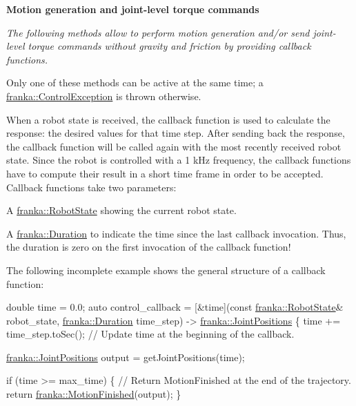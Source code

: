\begin{Indent}\textbf{ Motion generation and joint-\/level torque commands}\par
{\em The following methods allow to perform motion generation and/or send joint-\/level torque commands without gravity and friction by providing callback functions.

Only one of these methods can be active at the same time; a \hyperlink{structfranka_1_1ControlException}{franka\+::\+Control\+Exception} is thrown otherwise.

\label{classfranka_1_1Robot_callback-docs}%
%
When a robot state is received, the callback function is used to calculate the response\+: the desired values for that time step. After sending back the response, the callback function will be called again with the most recently received robot state. Since the robot is controlled with a 1 k\+Hz frequency, the callback functions have to compute their result in a short time frame in order to be accepted. Callback functions take two parameters\+:


\begin{DoxyItemize}
\item A \hyperlink{structfranka_1_1RobotState}{franka\+::\+Robot\+State} showing the current robot state.
\item A \hyperlink{classfranka_1_1Duration}{franka\+::\+Duration} to indicate the time since the last callback invocation. Thus, the duration is zero on the first invocation of the callback function!
\end{DoxyItemize}

The following incomplete example shows the general structure of a callback function\+:


\begin{DoxyCode}
\textcolor{keywordtype}{double} time = 0.0;
\textcolor{keyword}{auto} control\_callback = [&time](\textcolor{keyword}{const} \hyperlink{structfranka_1_1RobotState}{franka::RobotState}& robot\_state,
                                \hyperlink{classfranka_1_1Duration}{franka::Duration} time\_step) -> 
      \hyperlink{classfranka_1_1JointPositions}{franka::JointPositions} \{
  time += time\_step.toSec();  \textcolor{comment}{// Update time at the beginning of the callback.}

  \hyperlink{classfranka_1_1JointPositions}{franka::JointPositions} output = getJointPositions(time);

  \textcolor{keywordflow}{if} (time >= max\_time) \{
    \textcolor{comment}{// Return MotionFinished at the end of the trajectory.}
    \textcolor{keywordflow}{return} \hyperlink{namespacefranka_a20791f7142d78bbbe3c957cc66a23ade}{franka::MotionFinished}(output);
  \}


\end{DoxyCode}}
\end{Indent}
